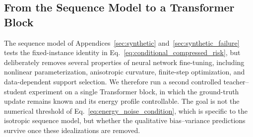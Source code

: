 \subsection{From the Sequence Model to a Transformer Block}
\label{sec:transformer_synthetic}

The sequence model of Appendices~\ref{sec:synthetic} and~\ref{sec:synthetic_failure} tests the fixed-instance identity in Eq.~\eqref{eq:conditional_compressed_risk}, but deliberately removes several properties of neural
network fine-tuning, including nonlinear parameterization, anisotropic
curvature, finite-step optimization, and data-dependent support selection.
We therefore run a second controlled teacher--student experiment on a single
Transformer block, in which the ground-truth update remains known and its
energy profile controllable. The goal is not the numerical threshold of
Eq.~\eqref{eq:energy_noise_condition}, which is specific to the isotropic
sequence model, but whether the qualitative bias--variance predictions
survive once these idealizations are removed.

